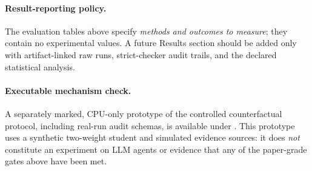\paragraph{Result-reporting policy.}
The evaluation tables above specify \emph{methods and outcomes to
measure}; they contain no experimental values. A future Results
section should be added only with artifact-linked raw runs,
strict-checker audit trails, and the declared statistical analysis.

\paragraph{Executable mechanism check.}
A separately marked, CPU-only prototype of the controlled
counterfactual protocol, including real-run audit schemas, is available
under . This prototype uses a
synthetic two-weight student and simulated evidence sources: it does
\emph{not} constitute an experiment on LLM agents or evidence that
any of the paper-grade gates above have been met.
